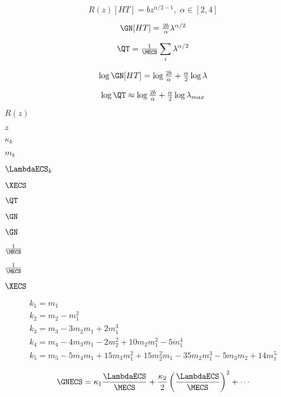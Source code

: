 \begin{equation}
\label{eqn:LW_model_0} 
R(z)[HT] = bz^{\alpha/2-1},\;\alpha\in[2,4]
\end{equation}

\begin{equation}
\label{eqn:LW_model_0} 
\GN[HT] = \tfrac{2b}{\alpha} \lambda^{\alpha/2}
\end{equation}

\begin{equation}
  \label{eqn:LW_model_1}
  \QT = \tfrac{1}{\MECS}\sum_{i}\lambda^{\alpha/2}
\end{equation}

\begin{equation}
\label{eqn:LW_model_2} 
\log \GN[HT] =  \log\tfrac{2b}{\alpha} +\tfrac{\alpha}{2}\log\lambda
\end{equation}

\begin{equation}
\label{eqn:LW_model_3} 
\log \QT \approx   \log\tfrac{2b}{\alpha} +\tfrac{\alpha}{2}\log\lambda_{max}
\end{equation}


$R(z)$

$z$

$\kappa_{k}$

$m_{k}$

$\LambdaECS_{k}$

$\mathbf\XECS$

$\QT$

$\GN$

$\GN$

$\tfrac{1}{\MECS}$

$\tfrac{1}{\MECS}$

$\XECS$

\begin{align}
  \label{eqn:kappa_defn_2}
  k_1 = m_1 \\ \nonumber
  k_2 = m_2 - m_1^2 \\ \nonumber
  k_3 = m_3 - 3 m_2 m_1 + 2 m_1^3 \\ \nonumber
  k_4 = m_4 - 4 m_3 m_1 - 2 m_2^2 + 10 m_2 m_1^2 - 5 m_1^4 \\ \nonumber 
  k_5 = m_5 - 5 m_4 m_1 + 15 m_3 m_1^2 + 15 m_2^2 m_1 - 35 m_2 m_1^3 - 5 m_3 m_2 + 14 m_1^5
\end{align}

\begin{align}
  \label{eqn:G_lambda_series}
\GNECS=\kappa_{1}\frac{\LambdaECS}{\MECS}+\frac{\kappa_{2}}{2}\left(\dfrac{\LambdaECS}{\MECS}\right)^{2}+\cdots
\end{align}

